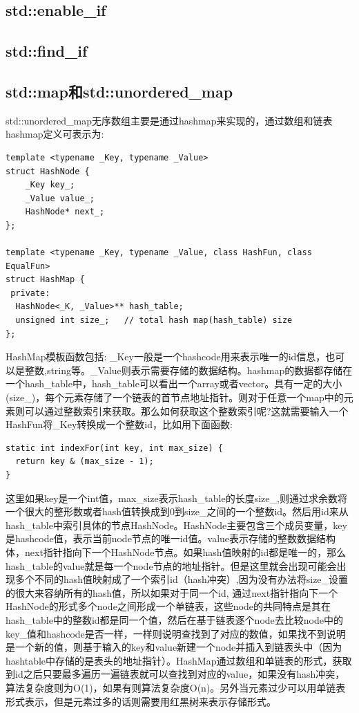 \documentclass[12pt]{book}
\begin{document}
\subsection{std::enable\_if}
\subsection{std::find\_if}
\subsection{std::map和std::unordered\_map}
std::unordered\_map无序数组主要是通过hashmap来实现的，通过数组和链表hashmap定义可表示为:
\begin{lstlisting}
template <typename _Key, typename _Value>
struct HashNode {
	_Key key_;
	_Value value_;
	HashNode* next_;
};

template <typename _Key, typename _Value, class HashFun, class EqualFun>
struct HashMap {
 private:
  HashNode<_K, _Value>** hash_table;
  unsigned int size_;   // total hash map(hash_table) size
};
\end{lstlisting}
HashMap模板函数包括: \_Key一般是一个hashcode用来表示唯一的id信息，也可以是整数,string等。\_Value则表示需要存储的数据结构。hashmap的数据都存储在一个hash\_table中，hash\_table可以看出一个array或者vector。具有一定的大小(size\_)，每个元素存储了一个链表的首节点地址指针。则对于任意一个map中的元素则可以通过整数索引来获取。那么如何获取这个整数索引呢?这就需要输入一个HashFun将\_Key转换成一个整数id，比如用下面函数:
\begin{lstlisting}
static int indexFor(int key, int max_size) {  
  return key & (max_size - 1);
}
\end{lstlisting}
这里如果key是一个int值，max\_size表示hash\_table的长度size\_,则通过求余数将一个很大的整形数或者hash值转换成到0到size\_之间的一个整数id。然后用id来从hash\_table中索引具体的节点HashNode。HashNode主要包含三个成员变量，key是hashcode值，表示当前node节点的唯一id值。value表示存储的整数数据结构体，next指针指向下一个HashNode节点。如果hash值映射的id都是唯一的，那么hash\_table的value就是每一个node节点的地址指针。但是这里就会出现可能会出现多个不同的hash值映射成了一个索引id（hash冲突）,因为没有办法将size\_设置的很大来容纳所有的hash值，所以如果对于同一个id, 通过next指针指向下一个HashNode的形式多个node之间形成一个单链表，这些node的共同特点是其在hash\_table中的整数id都是同一个值，然后在基于链表逐个node去比较node中的key\_值和hashcode是否一样，一样则说明查找到了对应的数值，如果找不到说明是一个新的值，则基于输入的key和value新建一个node并插入到链表头中（因为hashtable中存储的是表头的地址指针）。HashMap通过数组和单链表的形式，获取到id之后只要最多遍历一遍链表就可以查找到对应的value，如果没有hash冲突，算法复杂度则为O(1)，如果有则算法复杂度O(n)。另外当元素过少可以用单链表形式表示，但是元素过多的话则需要用红黑树来表示存储形式。
\end{document}
